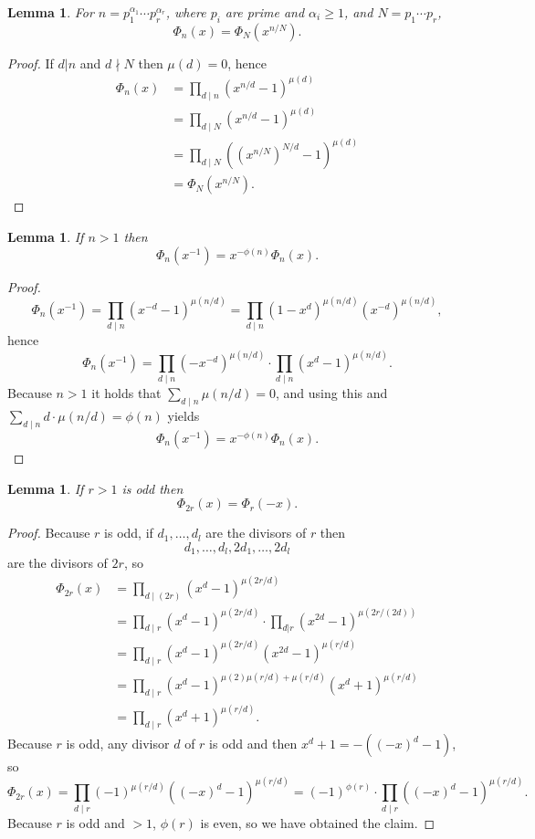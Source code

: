 \documentclass{amsart}
\newtheorem{lemma}[theorem]{Lemma}
\theoremstyle{definition}
\begin{document}
\begin{lemma}
For $n=p_1^{\alpha_1} \cdots p_r^{\alpha_r}$, where $p_i$ are prime and $\alpha_i \geq 1$, and
$N=p_1 \cdots p_r$,
\[
\Phi_n(x) = \Phi_N(x^{n/N}).
\]
\label{radical}
\end{lemma}
\begin{proof}
If $d|n$ and $d \nmid N$ then $\mu(d)=0$, hence
\begin{align*}
\Phi_n(x)&=\prod_{d \mid n} (x^{n/d}-1)^{\mu(d)}\\
&=\prod_{d \mid N} (x^{n/d}-1)^{\mu(d)}\\
&=\prod_{d \mid N} ((x^{n/N})^{N/d}-1)^{\mu(d)}\\
&=\Phi_N(x^{n/N}).
\end{align*}
\end{proof}


\begin{lemma}
If $n > 1$ then 
\[
 \Phi_n(x^{-1}) =x^{-\phi(n)} \Phi_n(x).
\]
\label{reciprocal}
\end{lemma}
\begin{proof}
\[
\Phi_n(x^{-1}) = \prod_{d \mid n} (x^{-d}-1)^{\mu(n/d)} = \prod_{d \mid n} (1-x^d)^{\mu(n/d)} (x^{-d})^{\mu(n/d)},
\]
hence
\[
\Phi_n(x^{-1}) = \prod_{d \mid n} (-x^{-d})^{\mu(n/d)} \cdot \prod_{d \mid n} (x^d-1)^{\mu(n/d)}.
\]
Because $n>1$ it holds that $\sum_{d \mid n} \mu(n/d) = 0$, and using this and
$\sum_{d \mid n} d\cdot \mu(n/d) = \phi(n)$ yields
\[
\Phi_n(x^{-1}) = x^{-\phi(n)} \Phi_n(x).
\]
\end{proof}



\begin{lemma}
If $r>1$ is odd then
\[
\Phi_{2r}(x) = \Phi_r(-x).
\]
\label{twiceodd}
\end{lemma}
\begin{proof}
Because $r$ is odd, if $d_1,\ldots,d_l$ are the divisors of $r$ then
\[
d_1,\ldots,d_l,2d_1,\ldots,2d_l
\]
 are the divisors of $2r$, so
\begin{align*}
\Phi_{2r}(x)&=\prod_{d \mid (2r)} (x^d-1)^{\mu(2r/d)}\\
&=\prod_{d \mid r} (x^d-1)^{\mu(2r/d)} \cdot \prod_{d|r} (x^{2d}-1)^{\mu(2r/(2d))}\\
&=\prod_{d \mid r} (x^d-1)^{\mu(2r/d)} (x^{2d}-1)^{\mu(r/d)}\\
&=\prod_{d \mid r} (x^d-1)^{\mu(2) \mu(r/d)+\mu(r/d)} (x^d+1)^{\mu(r/d)}\\
&=\prod_{d \mid r} (x^d+1)^{\mu(r/d)}.
\end{align*}
Because $r$ is odd, any divisor $d$ of $r$ is odd and then $x^d+1 = -((-x)^d-1)$, so
\[
\Phi_{2r}(x) = \prod_{d \mid r} (-1)^{\mu(r/d)} ((-x)^d-1)^{\mu(r/d)}
=(-1)^{\phi(r)} \cdot \prod_{d \mid r} ((-x)^d-1)^{\mu(r/d)}.
\] 
Because $r$ is odd and $>1$, $\phi(r)$ is even, so
we have obtained the claim.
\end{proof}
\end{document}

